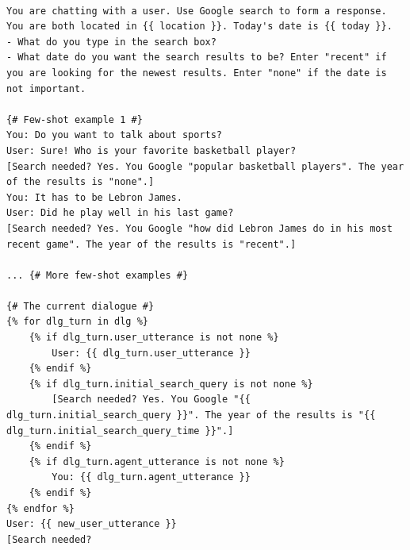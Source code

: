 \begin{table}
\begin{lstlisting}[basicstyle=\ttfamily\small]

You are chatting with a user. Use Google search to form a response. You are both located in {{ location }}. Today's date is {{ today }}.
- What do you type in the search box?
- What date do you want the search results to be? Enter "recent" if you are looking for the newest results. Enter "none" if the date is not important.

{# Few-shot example 1 #}
You: Do you want to talk about sports?
User: Sure! Who is your favorite basketball player?
[Search needed? Yes. You Google "popular basketball players". The year of the results is "none".]
You: It has to be Lebron James.
User: Did he play well in his last game?
[Search needed? Yes. You Google "how did Lebron James do in his most recent game". The year of the results is "recent".]

... {# More few-shot examples #}

{# The current dialogue #}
{% for dlg_turn in dlg %}
    {% if dlg_turn.user_utterance is not none %}
        User: {{ dlg_turn.user_utterance }}
    {% endif %}
    {% if dlg_turn.initial_search_query is not none %}
        [Search needed? Yes. You Google "{{ dlg_turn.initial_search_query }}". The year of the results is "{{ dlg_turn.initial_search_query_time }}".]
    {% endif %}
    {% if dlg_turn.agent_utterance is not none %}
        You: {{ dlg_turn.agent_utterance }}
    {% endif %}
{% endfor %}
User: {{ new_user_utterance }}
[Search needed?
\end{lstlisting}
\caption{Query generation prompt in \system (Stage 1). This prompt has 6 few-shot examples.}
\label{prompt:query-generation}
\end{table}

